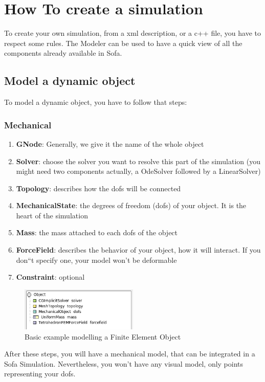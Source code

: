 
\section{How To create a simulation}
To create your own simulation, from a xml description, or a c++ file, you have to respect some rules.
The Modeler can be used to have a quick view of all the components already available in Sofa.
\subsection{Model a dynamic object}
To model a dynamic object, you have to follow that steps:
\subsubsection{Mechanical}
\begin{enumerate}
 \item { \bf GNode}: Generally, we give it the name of the whole object
 \item { \bf Solver}: choose the solver you want to resolve this part of the simulation (you might need two components actually, a OdeSolver followed by a LinearSolver)
 \item { \bf Topology}: describes how the dofs will be connected
 \item { \bf MechanicalState}: the degrees of freedom (dofs) of your object. It is the heart of the simulation
 \item { \bf Mass}: the mass attached to each dofs of the object
 \item { \bf ForceField}: describes the behavior of your object, how it will interact. If you don``t specify one, your model won't be deformable
 \item { \bf Constraint}: optional
\end{enumerate}

\begin{figure}
	\centering
		\includegraphics[width=0.5\textwidth]{Modelling0.jpg}
	\caption{Basic example modelling a Finite Element Object}
\end{figure}
After these steps, you will have a mechanical model, that can be integrated in a Sofa Simulation. Nevertheless, you won't have any visual model, only points representing your dofs.


